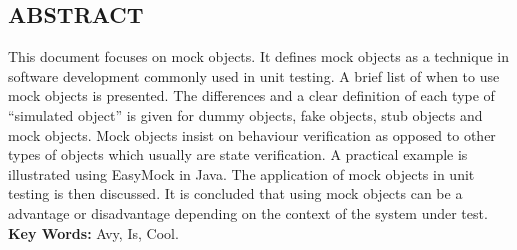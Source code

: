 \documentclass[12pt]{witseiepaper}
\begin{document}




 \thispagestyle{empty}\pagestyle{empty}
 \begin{center}
  \section{ABSTRACT}
  \end{center}
  This document focuses on mock objects. It defines mock objects as a technique in software development commonly used in unit testing. A brief list of when to use mock objects is presented. The differences and a clear definition of each type of ``simulated object'' is given for dummy objects, fake objects, stub objects and mock objects. Mock objects insist on behaviour verification as opposed to other types of objects which usually are state verification. A practical example is illustrated using EasyMock in Java. The application of mock objects in unit testing is then discussed. It is concluded that using mock objects can be a advantage or disadvantage depending on the context of the system under test.
 \\

{\bfseries Key Words: } Avy, Is, Cool.\\ [1.0cm]


\end{document}
